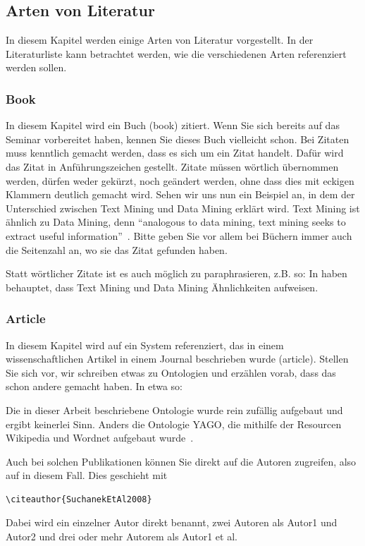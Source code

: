 \documentclass[
     11pt,         %
     a4paper,      %
     oneside,
     ]{article}
\begin{document}
\subsection{Arten von Literatur}
In diesem Kapitel werden einige Arten von Literatur vorgestellt. In der Literaturliste kann betrachtet werden, wie die verschiedenen Arten referenziert werden sollen.

\subsubsection{Book}
In diesem Kapitel wird ein Buch (book) zitiert. Wenn Sie sich bereits auf das Seminar vorbereitet haben, kennen Sie dieses Buch vielleicht schon.
Bei Zitaten muss kenntlich gemacht werden, dass es sich um ein Zitat handelt. Dafür wird das Zitat in Anführungszeichen gestellt. Zitate müssen wörtlich übernommen werden, dürfen weder gekürzt, noch geändert werden, ohne dass dies mit eckigen Klammern deutlich gemacht wird. Sehen wir uns nun ein Beispiel an, in dem der Unterschied zwischen Text Mining und Data Mining erklärt wird. Text Mining ist ähnlich zu Data Mining, denn ``analogous to data mining, text mining seeks to extract useful information''~\cite[S.1]{FeldmanSanger2007}. Bitte geben Sie vor allem bei Büchern immer auch die Seitenzahl an, wo sie das Zitat gefunden haben.

Statt wörtlicher Zitate ist es auch möglich zu paraphrasieren, z.B. so: In \cite{FeldmanSanger2007} haben \citeauthor{FeldmanSanger2007} behauptet, dass Text Mining und Data Mining Ähnlichkeiten aufweisen.

\subsubsection{Article}
In diesem Kapitel wird auf ein System referenziert, das in einem wissenschaftlichen Artikel in einem Journal beschrieben wurde (article). Stellen Sie sich vor, wir schreiben etwas zu Ontologien und erzählen vorab, dass das schon andere gemacht haben. In etwa so:

Die in dieser Arbeit beschriebene Ontologie wurde rein zufällig aufgebaut und ergibt keinerlei Sinn. Anders die Ontologie YAGO, die mithilfe der Resourcen Wikipedia und Wordnet aufgebaut wurde~\cite{SuchanekEtAl2008}.

Auch bei solchen Publikationen können Sie direkt auf die Autoren zugreifen, also auf \citeauthor{SuchanekEtAl2008} in diesem Fall. Dies geschieht mit \begin{verbatim}\citeauthor{SuchanekEtAl2008}\end{verbatim}
Dabei wird ein einzelner Autor direkt benannt, zwei Autoren als Autor1 und Autor2 und drei oder mehr Autorem als Autor1 et al.
\end{document}
